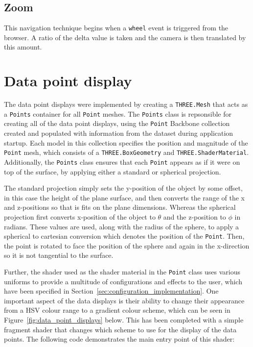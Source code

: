 {{		
	
	}

	\subsection{Zoom} {
	\label{sec:zoom}

		This navigation technique begins when a \texttt{wheel} event is triggered from the browser. A ratio of the delta value is taken and the camera is then translated by this amount.
	
	}

}

\section{Data point display} {
\label{sec:data_point_display}

	The data point displays were implemented by creating a \texttt{THREE.Mesh} that acts as a \texttt{Points} container for all \texttt{Point} meshes. The \texttt{Points} class is repsonsible for creating all of the data point displays, using the \texttt{Point} Backbone collection created and populated with information from the dataset during application startup. Each model in this collection specifies the position and magnitude of the \texttt{Point} mesh, which consists of a \texttt{THREE.BoxGeometry} and \texttt{THREE.ShaderMaterial}. Additionally, the \texttt{Points} class ensures that each \texttt{Point} appears as if it were on top of the surface, by applying either a standard or spherical projection.

	The standard projection simply sets the y-position of the object by some offset, in this case the height of the plane surface, and then converts the range of the x and z-positions so that is fits on the plane dimensions. Whereas the spherical projection first converts x-position of the object to $\theta$ and the z-position to $\phi$ in radians. These values are used, along with the radius of the sphere, to apply a spherical to cartesian conversion which denotes the position of the \texttt{Point}. Then, the point is rotated to face the position of the sphere and again in the x-direction so it is not tangential to the surface.

	Further, the shader used as the shader material in the \texttt{Point} class uses various uniforms to provide a multitude of configurations and effects to the user, which have been specified in Section~\ref{sec:configuration_implementation}. One important aspect of the data displays is their ability to change their appearance from a HSV colour range to a gradient colour scheme, which can be seen in Figure~\ref{fig:data_point_displays} below. This has been completed with a simple fragment shader that changes which scheme to use for the display of the data points. The following code demonstrates the main entry point of this shader:

	

	

}

